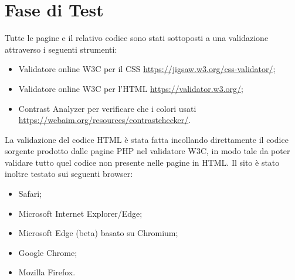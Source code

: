 \section{Fase di Test}
Tutte le pagine e il relativo codice sono stati sottoposti a una validazione attraverso i seguenti strumenti:
    \begin{itemize}
        \item Validatore online W3C per il CSS \url{https://jigsaw.w3.org/css-validator/};
        \item Validatore online W3C per l'HTML \url{https://validator.w3.org/};
        \item Contrast Analyzer per verificare che i colori usati \url{https://webaim.org/resources/contrastchecker/}.
    \end{itemize}
    La validazione del codice HTML è stata fatta incollando direttamente il codice sorgente prodotto dalle pagine PHP nel validatore W3C, in modo tale da poter validare tutto quel codice non presente nelle pagine in HTML.
    Il sito è stato inoltre testato sui seguenti browser:
    \begin{itemize}
        \item Safari;
        \item Microsoft Internet Explorer/Edge;
        \item Microsoft Edge (beta) basato su Chromium;
        \item Google Chrome;
        \item Mozilla Firefox.
    \end{itemize}

    
\pagebreak